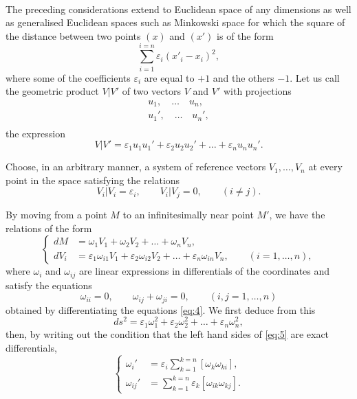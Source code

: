 \documentclass[leqno,12pt]{article}
\makeatletter
\let\old@epsilon\epsilon
\let\old@varepsilon\varepsilon
\let\epsilon\old@varepsilon
\let\varepsilon\old@epsilon
\theoremstyle{shape1}
\theoremstyle{shape0}
\theoremstyle{shape2}
\theoremstyle{definition}
\makeatother
\begin{document}
\paragraph{}
\label{sec:3}
The preceding considerations extend to Euclidean space of any dimensions as well as generalised Euclidean spaces such as Minkowski space for which the square of the distance between two points $(x)$ and $(x')$ is of the form
\[
\sum_{i=1}^{i=n}\epsilon_{i}(x'_{i}-x_{i})^{2},
\]
where some of the coefficients $\epsilon_{i}$ are equal to $+1$ and the others $-1$. Let us call the geometric product $V|V'$ of two vectors $V$ and $V'$ with projections
\begin{gather*}
  u_{1},\quad\dots\quad u_{n},\\
  u_{1}',\quad\dots\quad u_{n}',\\
\end{gather*}
the expression
\[
V|V'=\epsilon_{1}u_{1}u_{1}'+\epsilon_{2}u_{2}u_{2}'+\dots+\epsilon_{n}u_{n}u_{n}'.
\]

Choose, in an arbitrary manner, a system of reference vectors $V_{1},\dots,V_{n}$ at every point in the space satisfying the relations
\begin{equation}
  \label{eq:4}
  V_{i}|V_{i}=\epsilon_{i},\qquad V_{i}|V_{j}=0,\qquad (i\neq j).
\end{equation}

By moving from a point $M$ to an infinitesimally near point $M'$, we have the relations of the form
\begin{equation}
  \label{eq:5}
  \left\{
    \begin{aligned}
      dM&=\omega_{1}V_{1}+\omega_{2}V_{2}+\dots+\omega_{n}V_{n},\\
      dV_{i}&=\epsilon_{1}\omega_{i1}V_{1}+\epsilon_{2}\omega_{i2}V_{2}+\dots+\epsilon_{n}\omega_{in}V_{n},\qquad(i=1,\dots,n),
    \end{aligned}
  \right.
\end{equation}
where $\omega_{i}$ and $\omega_{ij}$ are linear expressions in differentials of the coordinates and satisfy the equations
\[
\omega_{ii}=0,\qquad\omega_{ij}+\omega_{ji}=0,\qquad(i,j=1,\dots,n)
\]
obtained by differentiating the equations \eqref{eq:4}. We first deduce from this
\begin{equation}
  \label{eq:6}
  ds^{2}=\epsilon_{1}\omega_{1}^{2}+\epsilon_{2}\omega_{2}^{2}+\dots+\epsilon_{n}\omega_{n}^{2},
\end{equation}
then, by writing out the condition that the left hand sides of \eqref{eq:5} are exact differentials,
\begin{equation}
  \label{eq:7}
  \left\{
    \begin{aligned}
      \omega_{i}'&=\epsilon_{i}\sum_{k=1}^{k=n}[\omega_{k}\omega_{ki}],\\
      \omega_{ij}'&=\sum_{k=1}^{k=n}\epsilon_{k}[\omega_{ik}\omega_{kj}].
    \end{aligned}
  \right.
\end{equation}
\end{document}
